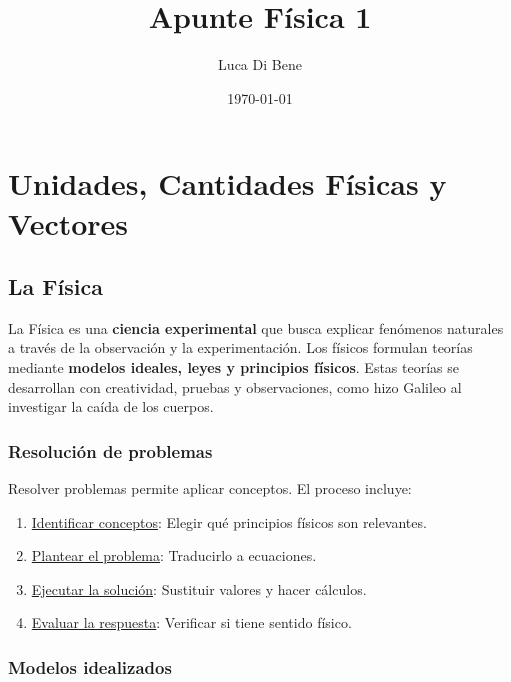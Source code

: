 \documentclass{article}
\title{Apunte Física 1}
\author{Luca Di Bene}
\date{\today}
\newcommand{\newsection}[1]{
    \vspace{0.5cm}
    {\color{sectionColor}
    \centering
    \section{\bl{#1}}}
    \color{black}
    \vspace{0.5cm}
}
\newcommand{\newsubsection}[1]{
    \vspace{0.5cm}
    \color{sectionColor}
    \subsection{ #1}
    \color{black}
    \vspace{0.5cm}
}
\newcommand{\newtitle}[1]{
    \color{titleColor}
    \subsubsection{\textbf{#1}}
    \color{black}
}
\newcommand{\bl}[1]{\textbf{#1}}
\begin{document}
    \maketitle
    \tableofcontents
    \newpage

    \newsection{Unidades, Cantidades Físicas y Vectores}


    \newsubsection{La Física}

    \par La Física es una \bl{ciencia experimental} que busca explicar fenómenos naturales a través de la observación y la experimentación. Los físicos formulan teorías mediante \bl{modelos ideales, leyes y principios físicos}. Estas teorías se desarrollan con creatividad, pruebas y observaciones, como hizo Galileo al investigar la caída de los cuerpos.

    \newtitle{Resolución de problemas}

    \par Resolver problemas permite aplicar conceptos. El proceso incluye:

    \begin{enumerate}
        \item \underline{Identificar conceptos}: Elegir qué principios físicos son relevantes.
        \item \underline{Plantear el problema}: Traducirlo a ecuaciones.
        \item \underline{Ejecutar la solución}: Sustituir valores y hacer cálculos.
        \item \underline{Evaluar la respuesta}: Verificar si tiene sentido físico.
    \end{enumerate} 

    \newtitle{Modelos idealizados}
    
\end{document}
